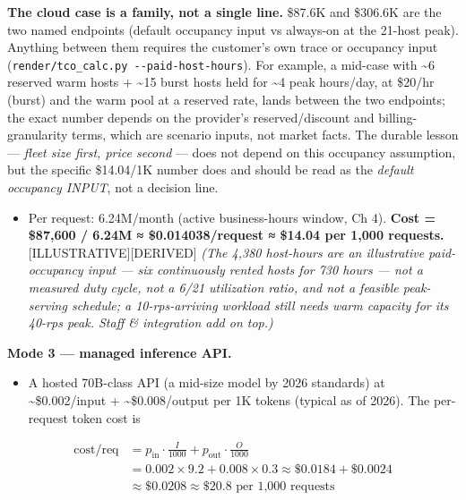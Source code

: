 \textbf{The cloud case is a family, not a single line.} \$87.6K and
\$306.6K are the two named endpoints (default occupancy input vs
always-on at the 21-host peak). Anything between them requires the
customer's own trace or occupancy input
(\texttt{render/tco\_calc.py\ -\/-paid-host-hours}). For example, a
mid-case with \textasciitilde6 reserved warm hosts + \textasciitilde15
burst hosts held for \textasciitilde4 peak hours/day, at \$20/hr (burst)
and the warm pool at a reserved rate, lands between the two endpoints;
the exact number depends on the provider's reserved/discount and
billing-granularity terms, which are scenario inputs, not market facts.
The durable lesson --- \emph{fleet size first, price second} --- does
not depend on this occupancy assumption, but the specific \$14.04/1K
number does and should be read as the \emph{default occupancy INPUT},
not a decision line.

\begin{itemize}
\tightlist
\item
  Per request: 6.24M/month (active business-hours window, Ch 4).
  \textbf{Cost = \$87,600 / 6.24M ≈ \$0.014038/request ≈ \$14.04 per
  1,000 requests.} \mbox{{[}ILLUSTRATIVE{]}}\hspace{0pt}\mbox{{[}DERIVED{]}} \emph{(The 4,380
  host-hours are an illustrative paid-occupancy input --- six
  continuously rented hosts for 730 hours --- not a measured duty cycle,
  not a 6/21 utilization ratio, and not a feasible peak-serving
  schedule; a 10-rps-arriving workload still needs warm capacity for its
  40-rps peak. Staff \& integration add on top.)}
\end{itemize}

\textbf{Mode 3 --- managed inference API.}

\begin{itemize}
\tightlist
\item
  A hosted 70B-class API (a mid-size model by 2026 standards) at
  \textasciitilde\$0.002/input + \textasciitilde\$0.008/output per 1K
  tokens (typical as of 2026). The per-request token cost is
\end{itemize}

\[
\begin{aligned}
\text{cost/req} &= p_\text{in} \cdot \frac{I}{1000} + p_\text{out} \cdot \frac{O}{1000}\\
&= 0.002 \times 9.2 + 0.008 \times 0.3 \approx \$0.0184 + \$0.0024\\
&\approx \$0.0208 \approx \$20.8 \text{ per 1,000 requests}
\end{aligned}
\]

